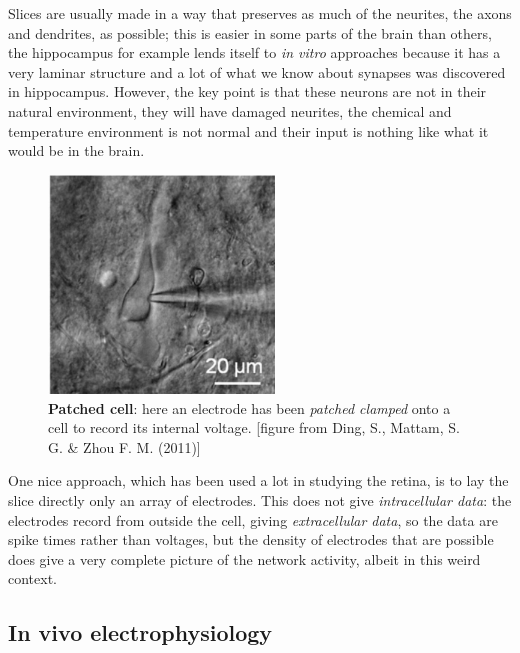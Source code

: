 \documentclass[12pt]{article}
\begin{document}
Slices are usually made in a way that preserves as much of the
neurites, the axons and dendrites, as possible; this is easier in some
parts of the brain than others, the hippocampus for example lends
itself to \textsl{in vitro} approaches because it has a very laminar
structure and a lot of what we know about synapses was discovered in
hippocampus. However, the key point is that these neurons are not in
their natural environment, they will have damaged neurites, the
chemical and temperature environment is not normal and their input is
nothing like what it would be in the brain.

\begin{figure}
  \begin{center}
    \includegraphics[width=6cm]{patch.png}
    \end{center}
  \caption{\textbf{Patched cell}: here an electrode has been \textsl{patched clamped} onto a cell to record its internal voltage. [figure from Ding, S., Mattam, S. G. \& Zhou F. M. (2011)]\label{fig:patch}}
\end{figure}

One nice approach, which has been used a lot in studying the retina,
is to lay the slice directly only an array of electrodes. This does
not give \textsl{intracellular data}: the electrodes record from
outside the cell, giving \textsl{extracellular data}, so the data are
spike times rather than voltages, but the density of electrodes that
are possible does give a very complete picture of the network
activity, albeit in this weird context.

\subsection*{In vivo electrophysiology}
\end{document}

